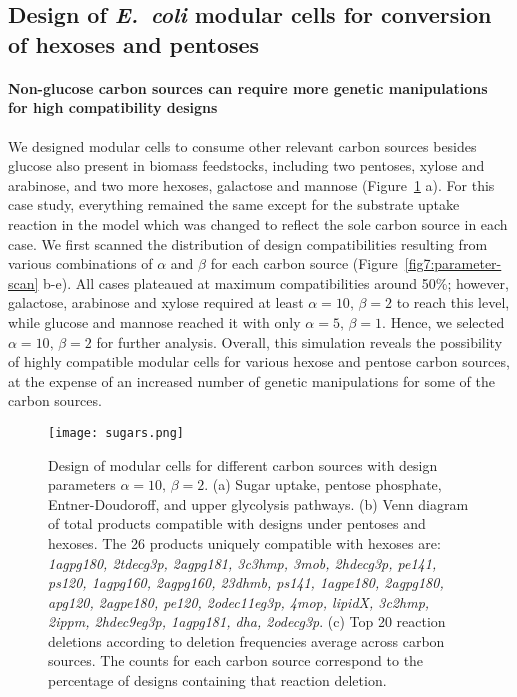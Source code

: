 {\subsection{Design of \textit{E.~coli} modular cells for conversion of hexoses and pentoses}
\paragraph{Non-glucose carbon sources can require more genetic manipulations for high compatibility designs}
We designed modular cells to consume other relevant carbon sources besides glucose also present in biomass feedstocks, including two pentoses, xylose and arabinose, and two more hexoses, galactose and mannose (Figure~\ref{fig7:sugars} a).
For this case study, everything remained the same except for the substrate uptake reaction in the model which was changed to reflect the sole carbon source in each case.
We first scanned the distribution of design compatibilities resulting from various combinations of $\alpha$ and $\beta$ for each carbon source (Figure~\ref{fig7:parameter-scan} b-e).
All cases plateaued at maximum compatibilities around 50\%; however, galactose, arabinose and xylose required at least $\alpha=10, \, \beta=2$ to reach this level, while glucose and mannose reached it with only $\alpha=5, \, \beta=1$.
Hence, we selected $\alpha=10, \, \beta=2$ for further analysis.
Overall, this simulation reveals the possibility of highly compatible modular cells for various hexose and pentose carbon sources, at the expense of an increased number of genetic manipulations for some of the carbon sources.

\begin{figure}[htp]
    \centering
    \texttt{[image: sugars.png]}
    \caption[Design of modular cells for different carbon sources]{Design of modular cells for different carbon sources with design parameters $\alpha=10, \, \beta=2$. (a) Sugar uptake, pentose phosphate, Entner-Doudoroff, and upper glycolysis pathways. (b) Venn diagram of total products compatible with designs under pentoses and hexoses.
    The 26 products uniquely compatible with hexoses are:
    \textit{1agpg180, 2tdecg3p, 2agpg181, 3c3hmp, 3mob, 2hdecg3p, pe141, ps120, 1agpg160, 2agpg160, 23dhmb, ps141, 1agpe180, 2agpg180, apg120, 2agpe180, pe120, 2odec11eg3p, 4mop, lipidX, 3c2hmp, 2ippm, 2hdec9eg3p, 1agpg181, dha, 2odecg3p}.
    (c) Top 20 reaction deletions according to deletion frequencies average across carbon sources. The counts for each carbon source correspond to the percentage of designs containing that reaction deletion.}
    \label{fig7:sugars}
\end{figure}


}
